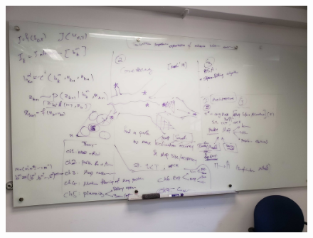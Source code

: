 \documentclass[letterpaper, 10 pt, conference]{ieeeconf}  %
\begin{document}
%
%
%
%
%









\clearpage{}
\begin{figure}[H]
  \centering
  \includegraphics[width=.5\textwidth]{figures/whiteboard1.jpg}
  \label{fig:whiteboard1}
\end{figure}
\end{document}
